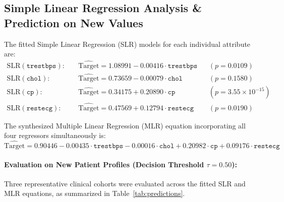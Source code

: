 \documentclass[12pt,a4paper]{article}
\begin{document}
\subsection{Simple Linear Regression Analysis \& Prediction on New Values}
The fitted Simple Linear Regression (SLR) models for each individual attribute are:
\begin{align}
    \text{SLR}(\texttt{trestbps}): \quad &\widehat{\text{Target}} = 1.08991 - 0.00416 \cdot \texttt{trestbps} && (p = 0.0109) \\
    \text{SLR}(\texttt{chol}): \quad     &\widehat{\text{Target}} = 0.73659 - 0.00079 \cdot \texttt{chol}     && (p = 0.1580) \\
    \text{SLR}(\texttt{cp}): \quad       &\widehat{\text{Target}} = 0.34175 + 0.20890 \cdot \texttt{cp}       && (p = 3.55 \times 10^{-15}) \\
    \text{SLR}(\texttt{restecg}): \quad  &\widehat{\text{Target}} = 0.47569 + 0.12794 \cdot \texttt{restecg}  && (p = 0.0190)
\end{align}

The synthesized Multiple Linear Regression (MLR) equation incorporating all four regressors simultaneously is:
\begin{equation}
    \widehat{\text{Target}} = 0.90446 - 0.00435 \cdot \texttt{trestbps} - 0.00016 \cdot \texttt{chol} + 0.20982 \cdot \texttt{cp} + 0.09176 \cdot \texttt{restecg}
\end{equation}

\paragraph{Evaluation on New Patient Profiles (Decision Threshold $\tau = 0.50$):}
Three representative clinical cohorts were evaluated across the fitted SLR and MLR equations, as summarized in Table~\ref{tab:predictions}.
\end{document}
